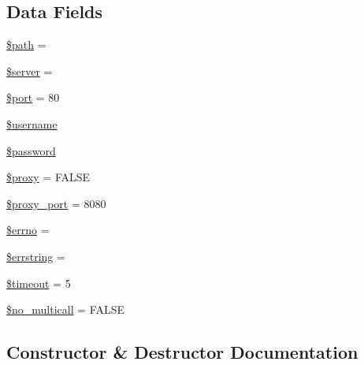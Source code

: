\subsection*{Data Fields}
\begin{DoxyCompactItemize}
\item 
\mbox{\hyperlink{class_x_m_l___r_p_c___client_a0a4baf0b22973c07685c3981f0d17fc4}{\$path}} = \textquotesingle{}\textquotesingle{}
\item 
\mbox{\hyperlink{class_x_m_l___r_p_c___client_ad135cc8a47e55f0829949cf62214170f}{\$server}} = \textquotesingle{}\textquotesingle{}
\item 
\mbox{\hyperlink{class_x_m_l___r_p_c___client_aa0787efab4b22e8a212882f3409d4c77}{\$port}} = 80
\item 
\mbox{\hyperlink{class_x_m_l___r_p_c___client_a0eb82aa5f81cf845de4b36cd653c42cf}{\$username}}
\item 
\mbox{\hyperlink{class_x_m_l___r_p_c___client_a607686ef9f99ea7c42f4f3dd3dbb2b0d}{\$password}}
\item 
\mbox{\hyperlink{class_x_m_l___r_p_c___client_a01564a63e754b8037a987f7f8fde0e6d}{\$proxy}} = F\+A\+L\+SE
\item 
\mbox{\hyperlink{class_x_m_l___r_p_c___client_a778054bf2337c6516bdad84294329511}{\$proxy\+\_\+port}} = 8080
\item 
\mbox{\hyperlink{class_x_m_l___r_p_c___client_a2be10a914e39a6b1f855ddf3b9a21367}{\$errno}} = \textquotesingle{}\textquotesingle{}
\item 
\mbox{\hyperlink{class_x_m_l___r_p_c___client_ac0e00fea1b952868a67648a9442a58da}{\$errstring}} = \textquotesingle{}\textquotesingle{}
\item 
\mbox{\hyperlink{class_x_m_l___r_p_c___client_a84320a9bf3e591d7ae20dfcb0dfe6a0d}{\$timeout}} = 5
\item 
\mbox{\hyperlink{class_x_m_l___r_p_c___client_a77b58d3e00e1054158dc707e34334497}{\$no\+\_\+multicall}} = F\+A\+L\+SE
\end{DoxyCompactItemize}


\subsection{Constructor \& Destructor Documentation}
\mbox{\label{class_x_m_l___r_p_c___client_ab665c9b62c100416c6c1e20ec650f553}} 
